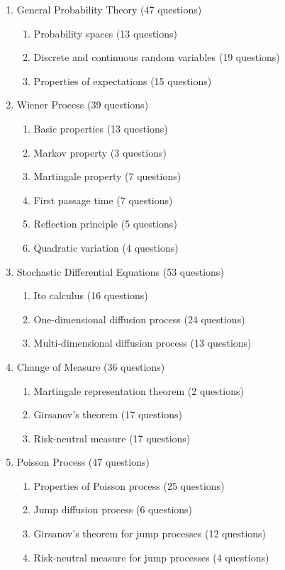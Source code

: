 \documentclass[hidelinks, 12pt]{article}
\theoremstyle{mydefstyle}
\theoremstyle{mythmstyle}
\newcounter{prop}
\begin{document}
\begin{enumerate}

\item General Probability Theory (47 questions)

\begin{enumerate} 
\item Probability spaces (13 questions)
\item Discrete and continuous random variables (19 questions)
\item Properties of expectations (15 questions)
\end{enumerate}

\item Wiener Process (39 questions)

\begin{enumerate}
\item Basic properties (13 questions)
\item Markov property (3 questions)
\item Martingale property (7 questions)
\item First passage time (7 questions)
\item Reflection principle (5 questions) 
\item Quadratic variation (4 questions)
\end{enumerate}

\item Stochastic Differential Equations (53 questions)

\begin{enumerate}
\item Ito calculus (16 questions)
\item One-dimensional diffusion process (24 questions)
\item Multi-dimensional diffusion process (13 questions)
\end{enumerate}

\item Change of Measure (36 questions)

\begin{enumerate} 
\item Martingale representation theorem (2 questions)
\item Girsanov's theorem (17 questions)
\item Risk-neutral measure (17 questions)
\end{enumerate}

\item Poisson Process (47 questions)

\begin{enumerate} 
\item Properties of Poisson process (25 questions)
\item Jump diffusion process (6 questions)
\item Girsanov's theorem for jump processes (12 questions)
\item Risk-neutral measure for jump processes (4 questions)
\end{enumerate}

\end{enumerate}
\end{document}
